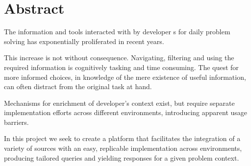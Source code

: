 \chapter*{Abstract}

The information and tools interacted with by developer s for daily problem solving has exponentially proliferated in recent years. 

This increase is not without consequence. Navigating, filtering and using the required information is cognitively tasking and time consuming. The quest for more informed choices, in knowledge of the mere existence of useful information, can often distract from the original task at hand. 

Mechanisms for enrichment of developer's context exist, but require separate implementation efforts across different environments, introducing apparent usage barriers.

In this project we seek to create a platform that facilitates the integration of a variety of sources with an easy, replicable implementation across environments, producing tailored queries and yielding responses for a given problem context.  

